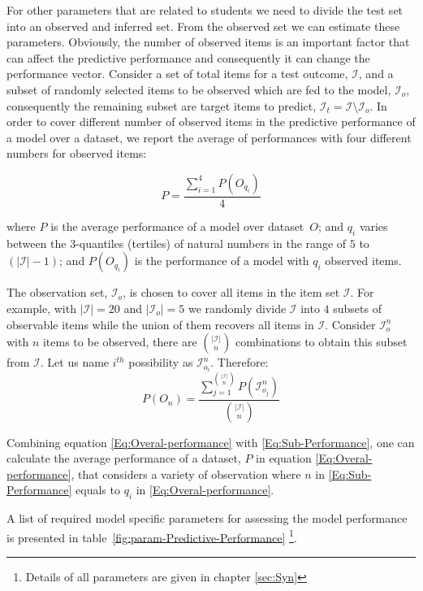 For other parameters that are related to students we need to divide the test set into an observed and inferred set. From the observed set we can estimate these parameters. Obviously, the number of observed items is an important factor that can affect the predictive performance and consequently it can change the performance vector. Consider a set of total items for a test outcome, $\mathcal{I}$, and a subset of randomly selected items to be observed which are fed to the model, $\mathcal{I}_o$, consequently the remaining subset are target items to predict, $\mathcal{I}_t = \mathcal{I}\setminus\mathcal{I}_o$. In order to cover different number of observed items in the predictive performance of a model over a dataset, we report the average of performances with four different numbers for observed items:

\begin{equation}
P = \frac{\sum_{i = 1}^{4}{P(O_{q_i})}}{4}
\label{Eq:Overal-performance}
\end{equation} 

 where $P$ is the average performance of a model over dataset~$O$; and $q_i$ varies between the 3-quantiles (tertiles) of natural numbers in the range of $5$ to $(|\mathcal{I}|-1)$; and $P(O_{q_i})$ is the performance of a model with $q_i$ observed items.

The observation set, $\mathcal{I}_o$, is chosen to cover all items in the item set $\mathcal{I}$. For example, with $|\mathcal{I}| = 20$ and $|\mathcal{I}_o| = 5$ we randomly divide $\mathcal{I}$ into $4$ subsets of observable items while the union of them recovers all items in $\mathcal{I}$. Consider $\mathcal{I}_o^n$ with $n$ items to be observed, there are ${|\mathcal{I}|\choose n}$ combinations to obtain this subset from $\mathcal{I}$. Let us name $i^{th}$ possibility as $\mathcal{I}_{o_i}^n$. Therefore:
\begin{equation}
P(O_n) = \frac{\sum_{j = 1}^{|\mathcal{I}|\choose n}{P(\mathcal{I}_{o_j}^n)}}{{|\mathcal{I}|\choose n}}
\label{Eq:Sub-Performance}
\end{equation}

Combining equation \ref{Eq:Overal-performance} with \ref{Eq:Sub-Performance}, one can calculate the average performance of a dataset, $P$ in equation \ref{Eq:Overal-performance}, that considers a variety of observation where $n$ in \ref{Eq:Sub-Performance} equals to $q_i$ in \ref{Eq:Overal-performance}.

A list of required model specific parameters for assessing the model performance is presented in table~\ref{fig:param-Predictive-Performance} \footnote{Details of all parameters are given in chapter \ref{sec:Syn}}.

